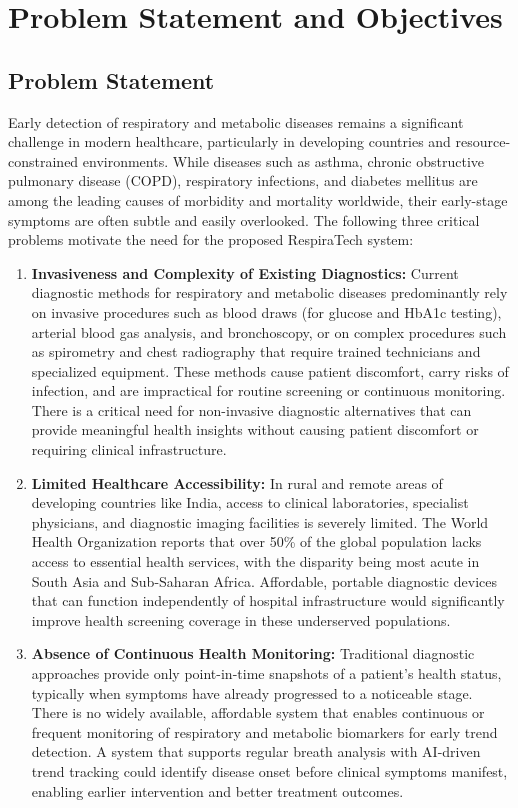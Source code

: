 \chapter{Problem Statement and Objectives}

\section{Problem Statement}
Early detection of respiratory and metabolic diseases remains a significant challenge in modern healthcare, particularly in developing countries and resource-constrained environments. While diseases such as asthma, chronic obstructive pulmonary disease (COPD), respiratory infections, and diabetes mellitus are among the leading causes of morbidity and mortality worldwide, their early-stage symptoms are often subtle and easily overlooked. The following three critical problems motivate the need for the proposed RespiraTech system:

\begin{enumerate}[leftmargin=1.5cm]
\item \textbf{Invasiveness and Complexity of Existing Diagnostics:} Current diagnostic methods for respiratory and metabolic diseases predominantly rely on invasive procedures such as blood draws (for glucose and HbA1c testing), arterial blood gas analysis, and bronchoscopy, or on complex procedures such as spirometry and chest radiography that require trained technicians and specialized equipment. These methods cause patient discomfort, carry risks of infection, and are impractical for routine screening or continuous monitoring. There is a critical need for non-invasive diagnostic alternatives that can provide meaningful health insights without causing patient discomfort or requiring clinical infrastructure.

\item \textbf{Limited Healthcare Accessibility:} In rural and remote areas of developing countries like India, access to clinical laboratories, specialist physicians, and diagnostic imaging facilities is severely limited. The World Health Organization reports that over 50\% of the global population lacks access to essential health services, with the disparity being most acute in South Asia and Sub-Saharan Africa. Affordable, portable diagnostic devices that can function independently of hospital infrastructure would significantly improve health screening coverage in these underserved populations.

\item \textbf{Absence of Continuous Health Monitoring:} Traditional diagnostic approaches provide only point-in-time snapshots of a patient's health status, typically when symptoms have already progressed to a noticeable stage. There is no widely available, affordable system that enables continuous or frequent monitoring of respiratory and metabolic biomarkers for early trend detection. A system that supports regular breath analysis with AI-driven trend tracking could identify disease onset before clinical symptoms manifest, enabling earlier intervention and better treatment outcomes.
\end{enumerate}

